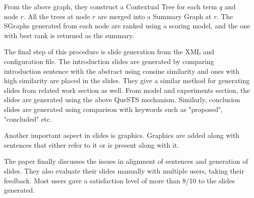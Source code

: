 \documentclass[conference]{IEEEtran}
\begin{document}
From the above graph, they construct a Contextual Tree for each term $q$ and node $r$.
All the trees at node $r$ are merged into a Summary Graph at $r$. The SGraphs generated
from each node are ranked using a scoring model, and the one with best rank is returned as
the summary.

The final step of this procedure is slide generation from the XML and configuration file.
The introduction slides are generated by comparing introduction sentence with the abstract 
using consine similarity and ones with high similarity are placed in the slides.
They give a similar method for generating slides from related work section as well.
From model and experiments section, the slides are generated using the above QueSTS
mechanism. Similarly, conclusion slides are generated using comparison with keywords
such as "proposed", "concluded" etc.

Another important aspect in slides is graphics. Graphics are added along with sentences 
that either refer to it or is present along with it.

The paper finally discusses the issues in alignment of sentences and generation of slides.
They also evaluate their slides manually with multiple users, taking their feedback.
Most users gave a satisfaction level of more than 8/10 to the slides generated.

\subsection{}


{\small


}
\end{document}
